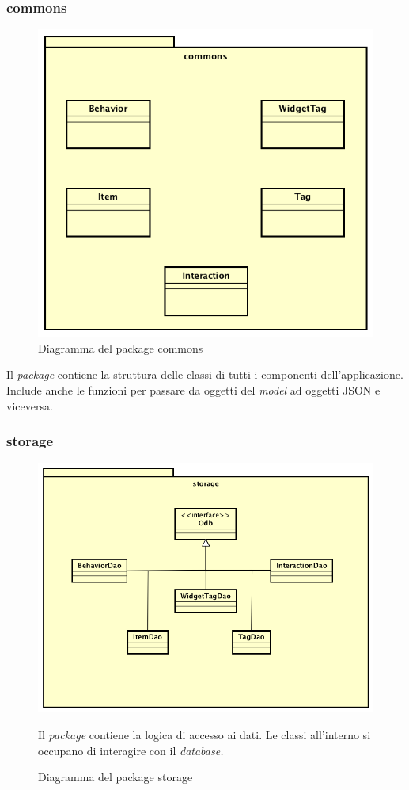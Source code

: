	\subsubsection*{commons}
	\begin{figure}[h]
	\centering
	\includegraphics[width=0.6\linewidth]{immagini/tres-commons}
	\caption[Diagramma del package commons]{Diagramma del package commons}
	\label{fig:tres-commons}
	\end{figure}
	Il \textit{package} contiene la struttura delle classi di tutti i componenti dell'applicazione. Include anche le funzioni per passare da oggetti del \textit{model} ad oggetti \gls{JSON} e viceversa.
	
\subsubsection*{storage}
	\begin{figure}[h]
	\centering
	\includegraphics[width=0.55\linewidth]{immagini/tres-storage}
	\caption[Diagramma del package storage]{Diagramma del package storage}
	\label{fig:tres-storage}
	Il \textit{package} contiene la logica di accesso ai dati. Le classi all'interno si occupano di interagire con il \textit{database.} 
\end{figure}

